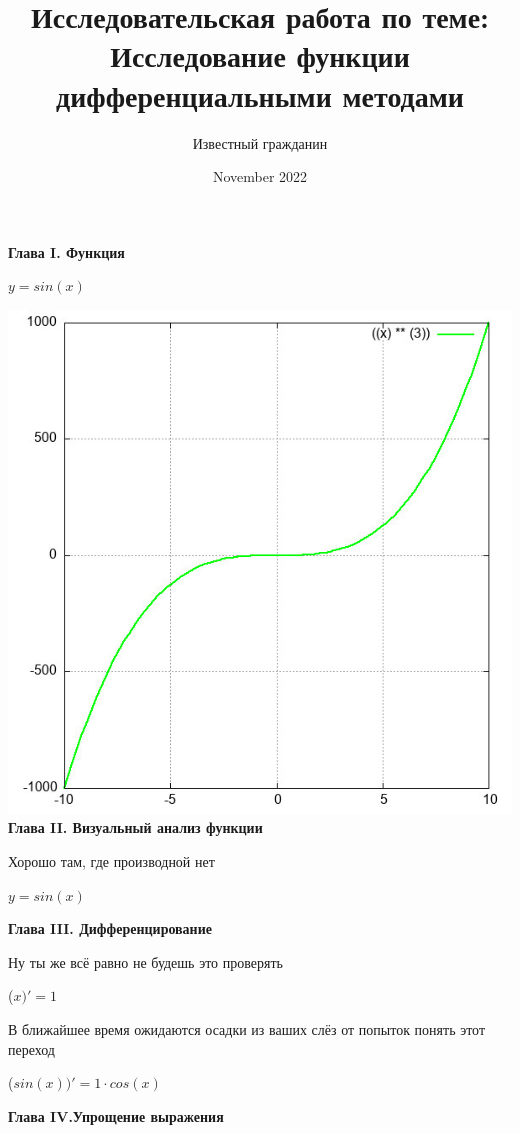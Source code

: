 \documentclass[12pt,a4paper,fleqn]{article}
\title{\textbf{\LARGE{Исследовательская работа по теме:\\Исследование функции дифференциальными методами}}}
\author{Известный гражданин}
\date{November 2022}
\begin{document}
\maketitle
\newpage\newpage \textbf{\LARGE{Глава I. Функция}}

\begin{center}
$y = $$sin(x)$

\end{center}
\includegraphics{GraphicDumps/plot.jpg}\newpage \textbf{\LARGE{Глава II. Визуальный анализ функции}}

Хорошо там, где производной нет\cite{link2}

\begin{center}
$y = $$sin(x)$

\end{center}
\newpage \textbf{\LARGE{Глава III. Дифференцирование}}

Ну ты же всё равно не будешь это проверять

\begin{center}
 ($x)'
  = 1$\end{center}
В ближайшее время ожидаются осадки из ваших слёз от попыток понять этот переход

\begin{center}
 ($sin(x))'
  = 1 \cdot cos(x)$\end{center}
\newpage \textbf{\LARGE{Глава IV.Упрощение выражения}}
\end{document}
